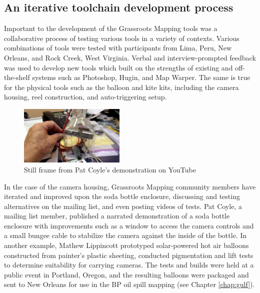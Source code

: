 \documentclass[11pt]{report}
\begin{document}
\subsection{An iterative toolchain development process}

Important to the development of the Grassroots Mapping tools was a collaborative process of testing various tools in a variety of contexts. Various combinations of tools were tested with participants from Lima, Peru, New Orleans, and Rock Creek, West Virginia. Verbal and interview-prompted feedback was used to develop new tools which built on the strengths of existing and off-the-shelf systems such as Photoshop, Hugin, and Map Warper. The same is true for the physical tools such as the balloon and kite kits, including the camera housing, reel construction, and auto-triggering setup. 

\begin{figure}
	\begin{flushright}
		\includegraphics[width=0.45\textwidth]{images/pat-coyle-video.png}
		\caption{Still frame from Pat Coyle's demonstration on YouTube\cite{coyle2010sodabottle}}
	\end{flushright}
\end{figure}

In the case of the camera housing, Grassroots Mapping community members have iterated and improved upon the soda bottle enclosure, discussing and testing alternatives on the mailing list, and even posting videos of tests. Pat Coyle, a mailing list member, published a narrated demonstration of a soda bottle enclosure with improvements such as a window to access the camera controls and a small bungee cable to stabilize the camera against the inside of the bottle. In another example, Mathew Lippincott prototyped solar-powered hot air balloons constructed from painter's plastic sheeting, conducted pigmentation and lift tests to determine suitability for carrying cameras. The tests and builds were held at a public event in Portland, Oregon, and the resulting balloons were packaged and sent to New Orleans for use in the BP oil spill mapping (see Chapter \ref{chap:gulf}). 
\end{document}
